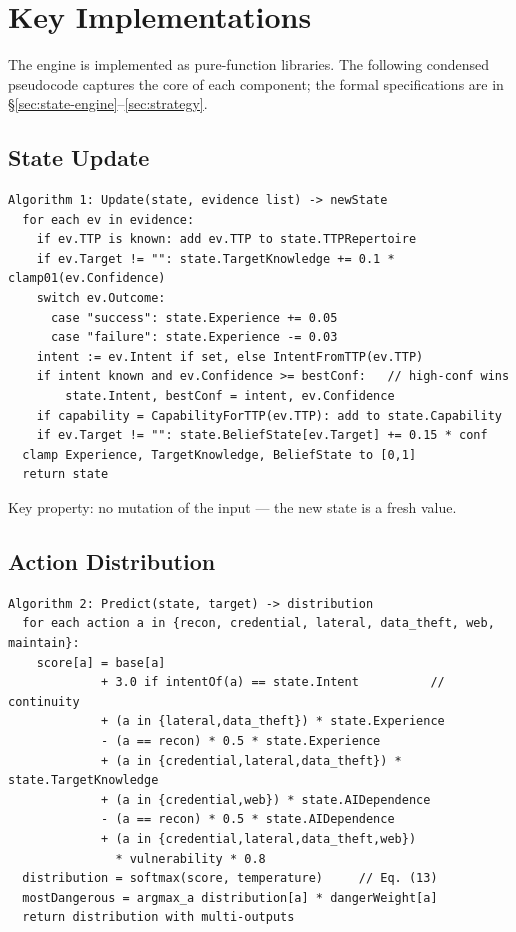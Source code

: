 \documentclass[11pt]{article}
\begin{document}
\section{Key Implementations}
\label{sec:impl}

The engine is implemented as pure-function libraries. The following
condensed pseudocode captures the core of each component; the formal
specifications are in \S\ref{sec:state-engine}--\ref{sec:strategy}.

\subsection{State Update}
\label{sec:impl-update}

\begin{verbatim}
Algorithm 1: Update(state, evidence list) -> newState
  for each ev in evidence:
    if ev.TTP is known: add ev.TTP to state.TTPRepertoire
    if ev.Target != "": state.TargetKnowledge += 0.1 * clamp01(ev.Confidence)
    switch ev.Outcome:
      case "success": state.Experience += 0.05
      case "failure": state.Experience -= 0.03
    intent := ev.Intent if set, else IntentFromTTP(ev.TTP)
    if intent known and ev.Confidence >= bestConf:   // high-conf wins
        state.Intent, bestConf = intent, ev.Confidence
    if capability = CapabilityForTTP(ev.TTP): add to state.Capability
    if ev.Target != "": state.BeliefState[ev.Target] += 0.15 * conf
  clamp Experience, TargetKnowledge, BeliefState to [0,1]
  return state
\end{verbatim}
Key property: no mutation of the input --- the new state is a fresh value.

\subsection{Action Distribution}
\label{sec:impl-predict}

\begin{verbatim}
Algorithm 2: Predict(state, target) -> distribution
  for each action a in {recon, credential, lateral, data_theft, web, maintain}:
    score[a] = base[a]
             + 3.0 if intentOf(a) == state.Intent          // continuity
             + (a in {lateral,data_theft}) * state.Experience
             - (a == recon) * 0.5 * state.Experience
             + (a in {credential,lateral,data_theft}) * state.TargetKnowledge
             + (a in {credential,web}) * state.AIDependence
             - (a == recon) * 0.5 * state.AIDependence
             + (a in {credential,lateral,data_theft,web})
               * vulnerability * 0.8
  distribution = softmax(score, temperature)     // Eq. (13)
  mostDangerous = argmax_a distribution[a] * dangerWeight[a]
  return distribution with multi-outputs
\end{verbatim}
\end{document}
